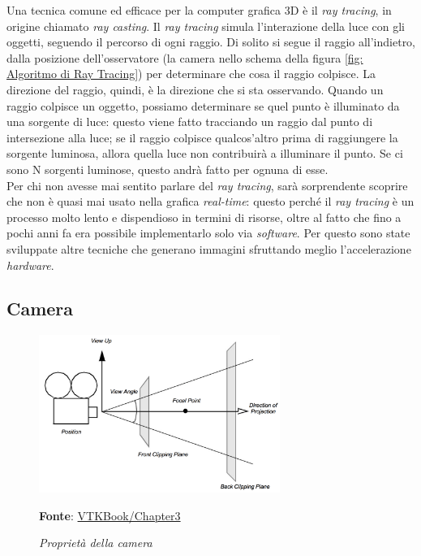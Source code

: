 Una tecnica comune ed efficace per la computer grafica 3D è il \emph{ray tracing}, in origine chiamato \emph{ray casting}. Il \emph{ray tracing} simula l'interazione della luce con gli oggetti, seguendo il percorso di ogni raggio. Di solito si segue il raggio all'indietro, dalla posizione dell'osservatore (la camera nello schema della figura \ref{fig: Algoritmo di Ray Tracing}) per determinare che cosa il raggio colpisce. La direzione del raggio, quindi, è la direzione che si sta osservando. Quando un raggio colpisce un oggetto, possiamo determinare se quel punto è illuminato da una sorgente di luce: questo viene fatto tracciando un raggio dal punto di intersezione alla luce; se il raggio colpisce qualcos'altro prima di raggiungere la sorgente luminosa, allora quella luce non contribuirà a illuminare il punto. Se ci sono N sorgenti luminose, questo andrà fatto per ognuna di esse.
\\
Per chi non avesse mai sentito parlare del \emph{ray tracing}, sarà sorprendente scoprire che non è quasi mai usato nella grafica \emph{real-time}: questo perché il \emph{ray tracing} è un processo molto lento e dispendioso in termini di risorse, oltre al fatto che fino a pochi anni fa era possibile implementarlo solo via \emph{software}. Per questo sono state sviluppate altre tecniche che generano immagini sfruttando meglio l'accelerazione \emph{hardware}.

\subsection{Camera}
\begin{figure}[h]
    \centering
    \includegraphics[width=0.7\textwidth]{immagini/volumerendering/camera.png}
    \caption{\textit{Proprietà della camera}}
    \textbf{Fonte}: \href{https://lorensen.github.io/VTKExamples/site/VTKBook/03Chapter3/}{VTKBook/Chapter3}
    \label{fig: Camera-View}
\end{figure}

